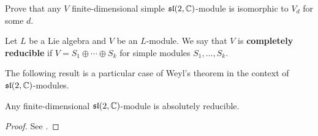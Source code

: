 \begin{exercise}
    Prove that any $V$ finite-dimensional simple 
    $\mathfrak{sl}(2,\mathbb{C})$-module is isomorphic to $V_d$ for some $d$. 
\end{exercise}

\begin{definition}
    Let $L$ be a Lie algebra and $V$ be an $L$-module. We say that
    $V$ is \textbf{completely reducible} if $V=S_1\oplus\cdots\oplus S_k$
    for simple modules $S_1,\dots,S_k$. 
\end{definition}

The following result is a particular
case of Weyl's theorem in the context of $\mathfrak{sl}(2,\mathbb{C})$-modules. 

\begin{theorem}
    Any finite-dimensional $\mathfrak{sl}(2,\mathbb{C})$-module is absolutely reducible. 
\end{theorem}

\begin{proof}
    See \cite[Exercises 8.6 and 9.15]{MR2218355}.
\end{proof}

    
    
    
    
